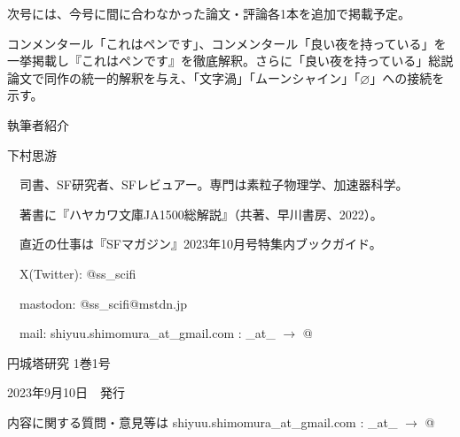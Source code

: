 \documentclass[10pt, a5paper, twoside]{jsarticle}
\theoremstyle{definition}
\begin{document}
	\vspace{15mm}

	\begin{screen}
		
		次号には、今号に間に合わなかった論文・評論各1本を追加で掲載予定。

		コンメンタール「これはペンです」、コンメンタール「良い夜を持っている」を一挙掲載し『これはペンです』を徹底解釈。さらに「良い夜を持っている」総説論文で同作の統一的解釈を与え、「文字渦」「ムーンシャイン」「$\varnothing$」への接続を示す。

	\end{screen}

	\newpage

	{\large 執筆者紹介}

	\vspace{3mm}

	下村思游

	　司書、SF研究者、SFレビュアー。専門は素粒子物理学、加速器科学。

	　著書に『ハヤカワ文庫JA1500総解説』（共著、早川書房、2022）。

	　直近の仕事は『SFマガジン』2023年10月号特集内ブックガイド。

	　X(Twitter): @ss\_scifi

	　mastodon: @ss\_scifi@mstdn.jp

	　mail: shiyuu.shimomura\_at\_gmail.com : \_at\_ $\rightarrow$ @

	\vfill

	\hrulefill

	\center

	{\Large 円城塔研究 1巻1号}

	2023年9月10日　発行


	\hrulefill

	内容に関する質問・意見等は shiyuu.shimomura\_at\_gmail.com : \_at\_ $\rightarrow$ @
\end{document}
